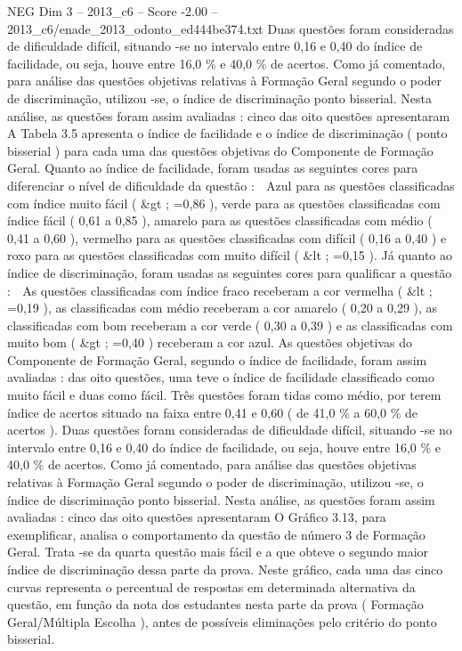 \begin{textsample}{NEG Dim 3 – 2013\_c6 – Score -2.00 – 2013\_c6/enade\_2013\_odonto\_ed444be374.txt}
Duas questões foram consideradas de dificuldade difícil, situando -se no intervalo entre 0,16 e 0,40 do índice de facilidade, ou seja, houve entre 16,0 \% e 40,0 \% de acertos.
Como já comentado, para análise das questões objetivas relativas à Formação Geral segundo o poder de discriminação, utilizou -se, o índice de discriminação ponto bisserial.
Nesta análise, as questões foram assim avaliadas : cinco das oito questões apresentaram A Tabela 3.5 apresenta o índice de facilidade e o índice de discriminação ( ponto bisserial ) para cada uma das questões objetivas do Componente de Formação Geral.
Quanto ao índice de facilidade, foram usadas as seguintes cores para diferenciar o nível de dificuldade da questão :  Azul para as questões classificadas com índice muito fácil ( \&gt ; =0,86 ), verde para as questões classificadas com índice fácil ( 0,61 a 0,85 ), amarelo para as questões classificadas com médio ( 0,41 a 0,60 ), vermelho para as questões classificadas com difícil ( 0,16 a 0,40 ) e roxo para as questões classificadas com muito difícil ( \&lt ; =0,15 ).
Já quanto ao índice de discriminação, foram usadas as seguintes cores para qualificar a questão :  As questões classificadas com índice fraco receberam a cor vermelha ( \&lt ; =0,19 ), as classificadas com médio receberam a cor amarelo ( 0,20 a 0,29 ), as classificadas com bom receberam a cor verde ( 0,30 a 0,39 ) e as classificadas com muito bom ( \&gt ; =0,40 ) receberam a cor azul.
As questões objetivas do Componente de Formação Geral, segundo o índice de facilidade, foram assim avaliadas : das oito questões, uma teve o índice de facilidade classificado como muito fácil e duas como fácil.
Três questões foram tidas como médio, por terem índice de acertos situado na faixa entre 0,41 e 0,60 ( de 41,0 \% a 60,0 \% de acertos ).
Duas questões foram consideradas de dificuldade difícil, situando -se no intervalo entre 0,16 e 0,40 do índice de facilidade, ou seja, houve entre 16,0 \% e 40,0 \% de acertos.
Como já comentado, para análise das questões objetivas relativas à Formação Geral segundo o poder de discriminação, utilizou -se, o índice de discriminação ponto bisserial.
Nesta análise, as questões foram assim avaliadas : cinco das oito questões apresentaram O Gráfico 3.13, para exemplificar, analisa o comportamento da questão de número 3 de Formação Geral.
Trata -se da quarta questão mais fácil e a que obteve o segundo maior índice de discriminação dessa parte da prova.
Neste gráfico, cada uma das cinco curvas representa o percentual de respostas em determinada alternativa da questão, em função da nota dos estudantes nesta parte da prova ( Formação Geral/Múltipla Escolha ), antes de possíveis eliminações pelo critério do ponto bisserial.

\end{textsample}

